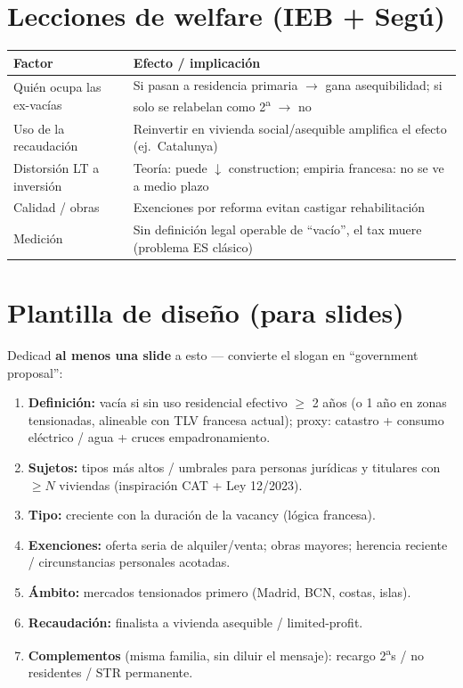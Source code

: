 \documentclass[11pt,a4paper]{report}
\begin{document}
\section{Lecciones de welfare (IEB + Seg\'u)}

\begin{center}
\renewcommand{\arraystretch}{1.25}
\begin{tabularx}{\textwidth}{@{}>{\raggedright\arraybackslash}p{4cm} X@{}}
\toprule
\textbf{Factor} & \textbf{Efecto / implicaci\'on} \\
\midrule
Qui\'en ocupa las ex-vac\'ias &
Si pasan a residencia primaria $\rightarrow$ gana asequibilidad; si solo se relabelan como 2\textsuperscript{a} $\rightarrow$ no \\
Uso de la recaudaci\'on &
Reinvertir en vivienda social/asequible amplifica el efecto (ej.\ Catalunya) \\
Distorsi\'on LT a inversi\'on &
Teor\'ia: puede $\downarrow$ construction; empiria francesa: no se ve a medio plazo \\
Calidad / obras &
Exenciones por reforma evitan castigar rehabilitaci\'on \\
Medici\'on &
Sin definici\'on legal operable de ``vac\'io'', el tax muere (problema ES cl\'asico) \\
\bottomrule
\end{tabularx}
\end{center}

\section{Plantilla de dise\~no (para slides)}

Dedicad \textbf{al menos una slide} a esto --- convierte el slogan en
``government proposal'':

\begin{enumerate}[leftmargin=1.8em]
  \item \textbf{Definici\'on:} vac\'ia si sin uso residencial efectivo $\ge$ 2 a\~nos
        (o 1 a\~no en zonas tensionadas, alineable con TLV francesa actual);
        proxy: catastro + consumo el\'ectrico / agua + cruces empadronamiento.
  \item \textbf{Sujetos:} tipos m\'as altos / umbrales para personas jur\'idicas y
        titulares con $\ge N$ viviendas (inspiraci\'on CAT + Ley 12/2023).
  \item \textbf{Tipo:} creciente con la duraci\'on de la vacancy (l\'ogica francesa).
  \item \textbf{Exenciones:} oferta seria de alquiler/venta; obras mayores;
        herencia reciente / circunstancias personales acotadas.
  \item \textbf{\'Ambito:} mercados tensionados primero (Madrid, BCN, costas, islas).
  \item \textbf{Recaudaci\'on:} finalista a vivienda asequible / limited-profit.
  \item \textbf{Complementos} (misma familia, sin diluir el mensaje):
        recargo 2\textsuperscript{a}s / no residentes / STR permanente.
\end{enumerate}
\end{document}
